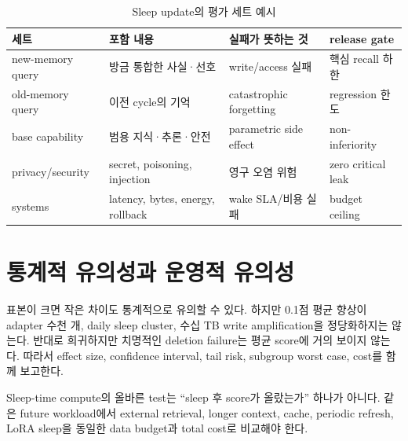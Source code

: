 \begin{table}[htbp]
\centering
\caption{Sleep update의 평가 세트 예시}
\label{tab:bg-sleep-evaluation}
\begin{tabularx}{\textwidth}{L{0.20\textwidth}YYL{0.20\textwidth}}
\toprule
세트 & 포함 내용 & 실패가 뜻하는 것 & release gate \\
\midrule
new-memory query & 방금 통합한 사실·선호 & write/access 실패 & 핵심 recall 하한 \\
old-memory query & 이전 cycle의 기억 & catastrophic forgetting & regression 한도 \\
base capability & 범용 지식·추론·안전 & parametric side effect & non-inferiority \\
privacy/security & secret, poisoning, injection & 영구 오염 위험 & zero critical leak \\
systems & latency, bytes, energy, rollback & wake SLA/비용 실패 & budget ceiling \\
\bottomrule
\end{tabularx}
\end{table}

\section{통계적 유의성과 운영적 유의성}

표본이 크면 작은 차이도 통계적으로 유의할 수 있다. 하지만 0.1점 평균 향상이 adapter
수천 개, daily sleep cluster, 수십 TB write amplification을 정당화하지는 않는다. 반대로
희귀하지만 치명적인 deletion failure는 평균 score에 거의 보이지 않는다. 따라서 effect
size, confidence interval, tail risk, subgroup worst case, cost를 함께 보고한다.

\begin{keypoint}
Sleep-time compute의 올바른 test는 ``sleep 후 score가 올랐는가'' 하나가 아니다.
같은 future workload에서 external retrieval, longer context, cache, periodic refresh,
LoRA sleep을 동일한 data budget과 total cost로 비교해야 한다.
\end{keypoint}
